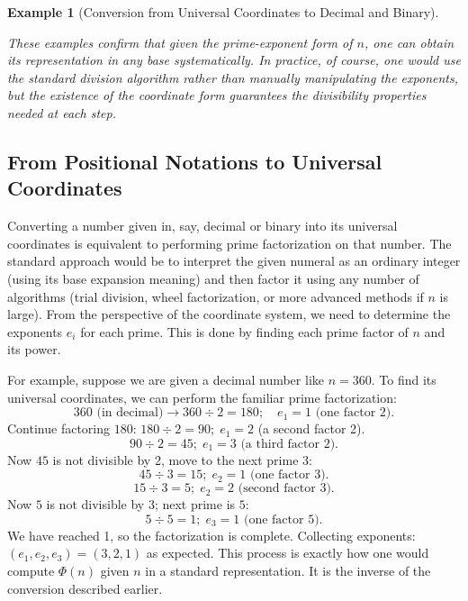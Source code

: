 \documentclass[11pt]{article}
\newtheorem{example}{Example}
\begin{document}
\begin{example}[Conversion from Universal Coordinates to Decimal and Binary]
\begin{itemize}
\end{itemize}
These examples confirm that given the prime-exponent form of $n$, one can obtain its representation in any base systematically. In practice, of course, one would use the standard division algorithm rather than manually manipulating the exponents, but the existence of the coordinate form guarantees the divisibility properties needed at each step.
\end{example}

\subsection*{From Positional Notations to Universal Coordinates}

Converting a number given in, say, decimal or binary into its universal coordinates is equivalent to performing prime factorization on that number. The standard approach would be to interpret the given numeral as an ordinary integer (using its base expansion meaning) and then factor it using any number of algorithms (trial division, wheel factorization, or more advanced methods if $n$ is large). From the perspective of the coordinate system, we need to determine the exponents $e_i$ for each prime. This is done by finding each prime factor of $n$ and its power.

For example, suppose we are given a decimal number like $n = 360$. To find its universal coordinates, we can perform the familiar prime factorization:
\[
360 \text{ (in decimal)} \rightarrow 360 \div 2 = 180; \quad e_1=1 \text{ (one factor 2)}.
\]
Continue factoring $180$: $180 \div 2 = 90; \; e_1=2$ (a second factor 2).
\[
90 \div 2 = 45; \; e_1=3 \text{ (a third factor 2)}.
\]
Now $45$ is not divisible by 2, move to the next prime $3$:
\[
45 \div 3 = 15; \; e_2=1 \text{ (one factor 3)}.
\]
\[
15 \div 3 = 5; \; e_2=2 \text{ (second factor 3)}.
\]
Now $5$ is not divisible by 3; next prime is $5$:
\[
5 \div 5 = 1; \; e_3=1 \text{ (one factor 5)}.
\]
We have reached 1, so the factorization is complete. Collecting exponents: $(e_1,e_2,e_3) = (3,2,1)$ as expected. This process is exactly how one would compute $\Phi(n)$ given $n$ in a standard representation. It is the inverse of the conversion described earlier.
\end{document}
